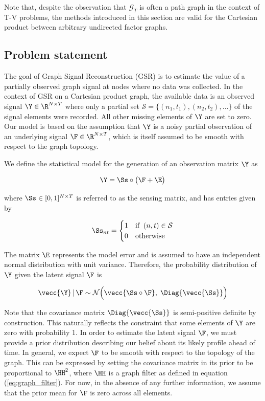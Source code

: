 Note that, despite the observation that $\mathcal{G}_T$ is often a path graph in the context of T-V problems, the methods introduced in this section are valid for the Cartesian product between arbitrary undirected factor graphs. 

\subsection{Problem statement}


The goal of Graph Signal Reconstruction (GSR) is to estimate the value of a partially observed graph signal at nodes where no data was collected. In the context of GSR on a Cartesian product graph, the available data is an observed signal $\Y \in \R^{N \times T}$ where only a partial set $\mathcal{S} = \{(n_1, t_1), (n_2, t_2), \dots \}$ of the signal elements were recorded. All other missing elements of $\Y$ are set to zero. Our model is based on the assumption that $\Y$ is a noisy partial observation of an underlying signal $\F \in \R^{N \times T}$, which is itself assumed to be smooth with respect to the graph topology. 

We define the statistical model for the generation of an observation matrix $\Y$ as 

\begin{equation}
    \Y = \Ss \circ \big(\F + \E \big)
\end{equation}

where $\Ss \in [0, 1]^{N \times T}$ is referred to as the sensing matrix, and has entries given by 

\begin{equation}
    \Ss_{nt} = \begin{cases}
        1 & \text{if} \;\; (n, t) \in \mathcal{S} \\
        0 & \text{otherwise}
    \end{cases}
\end{equation}

The matrix $\E$ represents the model error and is assumed to have an independent normal distribution with unit variance. Therefore, the probability distribution of $\Y$ given the latent signal $\F$ is

\begin{equation}
    \label{eq:Y_given_F}
    \vecc{\Y} \, | \, \F \sim \mathcal{N}\Big(\vecc{\Ss \circ \F}, \; \Diag{\vecc{\Ss}}\Big)
\end{equation}

Note that the covariance matrix $\Diag{\vecc{\Ss}}$ is semi-positive definite by construction. This naturally reflects the constraint that some elements of $\Y$ are zero with probability 1. In order to estimate the latent signal $\F$, we must provide a prior distribution describing our belief about its likely profile ahead of time. In general, we expect $\F$ to be smooth with respect to the topology of the graph. This can be expressed by setting the covariance matrix in its prior to be proportional to $\HH^2$, where $\HH$ is a graph filter as defined in equation (\ref{eq:graph_filter}). For now, in the absence of any further information, we assume that the prior mean for $\F$ is zero across all elements. 

